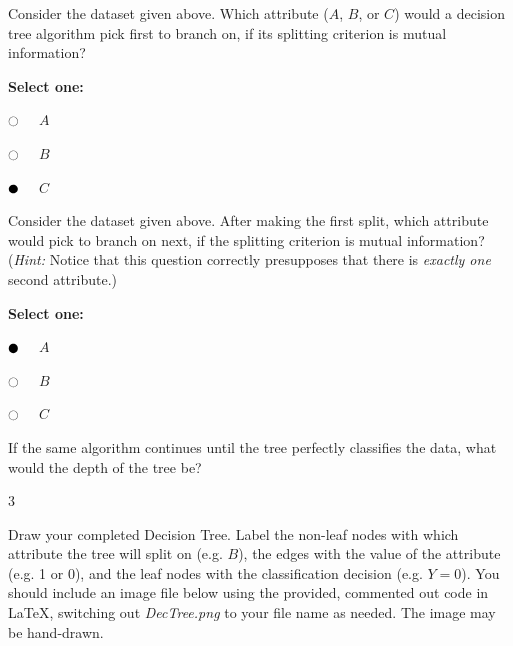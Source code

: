\documentclass[11pt,addpoints,answers]{exam}
\newcommand{\emptycircle}{{\LARGE $\fullmoon$}\ \ }
\newcommand{\filledcircle}{{\LARGE $\newmoon$}\ \ }
\begin{document}
\begin{questions}
\begin{your_solution}[title=Work,height=5cm,width=12cm]
    \end{your_solution}
    
    \clearpage

    \question[1] Consider the dataset given above. Which attribute ($A$, $B$, or $C$) would a decision tree algorithm pick first to branch on, if its splitting criterion is mutual information?
    
    \textbf{Select one:}
    \begin{list}{}
        \item
            \emptycircle
            $A$
        \item
            \emptycircle
            $B$
        \item
            \filledcircle
            $C$
    \end{list}

    
    \question[1] Consider the dataset given above. After making the first split, which attribute would pick to branch on next, if the splitting criterion is mutual information? (\emph{Hint:} Notice that this question correctly presupposes that there is \emph{exactly one} second attribute.)
    
    \textbf{Select one:}
    \begin{list}{}
        \item
            \filledcircle
            $A$
        \item
            \emptycircle
            $B$
        \item
            \emptycircle
            $C$
    \end{list}
    
    
    \question[1] If the same algorithm continues until the tree perfectly classifies the data, what would the depth of the tree be?
    
    \begin{your_solution}[title=Depth,height=2cm,width=3cm]
    3
    \end{your_solution}
    
\clearpage
    \question[4] Draw your completed Decision Tree. Label the non-leaf nodes with which attribute the tree will split on (e.g. $B$), the edges with the value of the attribute (e.g. 1 or 0), and the leaf nodes with the classification decision (e.g. $Y=0$). You should include an image file below using the provided, commented out code in LaTeX, switching out \textit{DecTree.png} to your file name as needed. The image may be hand-drawn.
    

\end{questions}
\end{document}
